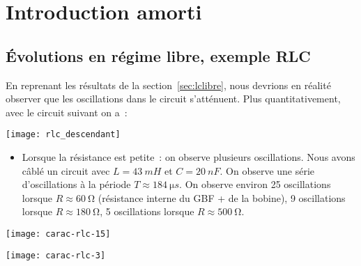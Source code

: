 \documentclass[../main/main.tex]{subfiles}
\begin{document}
\section{Introduction amorti}

\subsection{Évolutions en régime libre, exemple RLC}

\begin{minipage}{0.60\linewidth}
    En reprenant les résultats de la section~\ref{sec:lclibre}, nous devrions en
    réalité observer que les oscillations dans le circuit s’atténuent. Plus
    quantitativement, avec le circuit suivant on a~:
\end{minipage}
\begin{minipage}{0.40\linewidth}
    \begin{center}
        \texttt{[image: rlc\_descendant]}
    \end{center}
\end{minipage}

\begin{itemize}
    \item Lorsque la résistance est petite~: on observe plusieurs oscillations.
        Nous avons câblé un circuit avec $L = \SI{43}{mH}$ et $C = \SI{20}{nF}$.
        On observe une série d’oscillations à la période $T \approx \SI{184}{\micro
        s}$. On observe environ 25 oscillations lorsque $R \approx
        \SI{60}{\ohm}$ (résistance interne du GBF + de la bobine), 9
        oscillations lorsque $R \approx \SI{180}{\ohm}$, 5 oscillations lorsque
        $R \approx \SI{500}{\ohm}$.
\end{itemize}
\begin{minipage}{0.45\linewidth}
    \begin{center}
        \texttt{[image: carac-rlc-15]}
    \end{center}
\end{minipage}
\hfill
\begin{minipage}{0.45\linewidth}
    \begin{center}
        \texttt{[image: carac-rlc-3]}
    \end{center}
\end{minipage}
\end{document}
